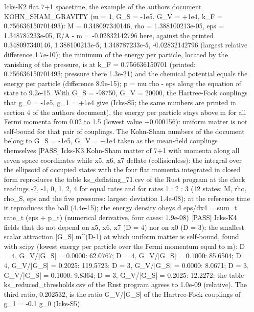 \documentclass[
  10pt,
]{article}
\newenvironment{Shaded}{}{}
\newcommand{\NormalTok}[1]{#1}
\begin{document}
\begin{Shaded}
\begin{Highlighting}[]
\NormalTok{[PASS] Icks{-}K2  flat 7+1 spacetime, the example of the author\textquotesingle{}s document KOHN\_SHAM\_GRAVITY (m = 1, G\_S = {-}1e5, G\_V = +1e4, k\_F = 0.756636150701493): M = 0.348097340146, rho = 1.388100213e{-}05, eps = 1.348787233e{-}05, E/A {-} m = {-}0.02832142796 here, against the printed 0.348097340146, 1.388100213e{-}5, 1.348787233e{-}5, {-}0.02832142796 (largest relative difference 1.7e{-}10); the minimum of the energy per particle, located by the vanishing of the pressure, is at k\_F = 0.756636150701 (printed: 0.756636150701493; pressure there 1.3e{-}21) and the chemical potential equals the energy per particle (difference 8.9e{-}15); p = mu rho {-} eps along the equation of state to 9.2e{-}15. With G\_S = {-}98750, G\_V = 20000, the Hartree{-}Fock couplings that g\_0 = {-}1e5, g\_1 = +1e4 give (Icks{-}S5; the same numbers are printed in section 4 of the author\textquotesingle{}s document), the energy per particle stays above m for all Fermi momenta from 0.02 to 1.5 (lowest value +0.000156): uniform matter is not self{-}bound for that pair of couplings. The Kohn{-}Sham numbers of the document belong to G\_S = {-}1e5, G\_V = +1e4 taken as the mean{-}field couplings themselves}
\NormalTok{[PASS] Icks{-}K3  Kohn{-}Sham matter of 7+1 with momenta along all seven space coordinates while x5, x6, x7 deflate (collisionless): the integral over the ellipsoid of occupied states with the four flat momenta integrated in closed form reproduces the table ks\_deflating\_71.csv of the Rust program at the clock readings {-}2, {-}1, 0, 1, 2, 4 for equal rates and for rates 1 : 2 : 3 (12 states; M, rho, rho\_S, eps and the five pressures: largest deviation 1.4e{-}08); at the reference time it reproduces the ball (4.4e{-}15); the energy density obeys d eps/dx4 = sum\_t rate\_t (eps + p\_t) (numerical derivative, four cases: 1.9e{-}08)}
\NormalTok{[PASS] Icks{-}K4  fields that do not depend on x5, x6, x7 (D = 4) nor on x0 (D = 3): the smallest scalar attraction |G\_S| m\^{}(D{-}1) at which uniform matter is self{-}bound, found with scipy (lowest energy per particle over the Fermi momentum equal to m): D = 4, G\_V/|G\_S| = 0.0000: 62.0767; D = 4, G\_V/|G\_S| = 0.1000: 85.6504; D = 4, G\_V/|G\_S| = 0.2025: 119.5723; D = 3, G\_V/|G\_S| = 0.0000: 8.0671; D = 3, G\_V/|G\_S| = 0.1000: 9.8364; D = 3, G\_V/|G\_S| = 0.2025: 12.2272; the table ks\_reduced\_thresholds.csv of the Rust program agrees to 1.0e{-}09 (relative). The third ratio, 0.202532, is the ratio G\_V/|G\_S| of the Hartree{-}Fock couplings of g\_1 = {-}0.1 g\_0 (Icks{-}S5)}

\end{Highlighting}
\end{Shaded}
\end{document}

